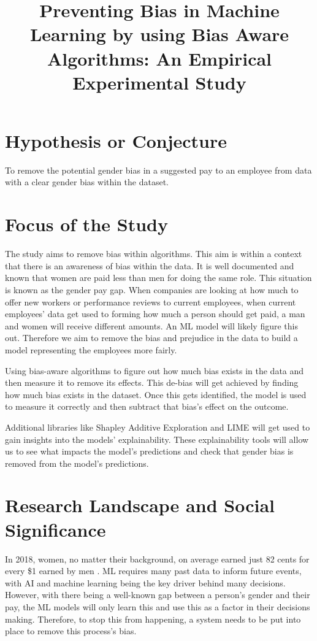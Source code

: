 \documentclass{sigchi}
\def\plaintitle{Preventing Bias in Machine Learning by using Bias Aware Algorithms: An Empirical Experimental Study}
\begin{document}
\title{\plaintitle}

\author{%
}

\maketitle

\section{Hypothesis or Conjecture}
To remove the potential gender bias in a suggested pay to an employee from data with a clear gender bias within the dataset.

\section{Focus of the Study}
The study aims to remove bias within algorithms. This aim is within a context that there is an awareness of bias within the data. It is well documented and known that women are paid less than men for doing the same role. This situation is known as the gender pay gap. When companies are looking at how much to offer new workers or performance reviews to current employees, when current employees' data get used to forming how much a person should get paid, a man and women will receive different amounts. An ML model will likely figure this out. Therefore we aim to remove the bias and prejudice in the data to build a model representing the employees more fairly.

Using bias-aware algorithms to figure out how much bias exists in the data and then measure it to remove its effects. This de-bias will get achieved by finding how much bias exists in the dataset. Once this gets identified, the model is used to measure it correctly and then subtract that bias's effect on the outcome.

Additional libraries like Shapley Additive Exploration and LIME will get used to gain insights into the models' explainability. These explainability tools will allow us to see what impacts the model's predictions and check that gender bias is removed from the model's predictions. 


\section{Research Landscape and Social Significance}
In 2018, women, no matter their background, on average earned just 82 cents for every \$1 earned by men \cite{paygapfacts}. ML requires many past data to inform future events, with AI and machine learning being the key driver behind many decisions. However, with there being a well-known gap between a person's gender and their pay, the ML models will only learn this and use this as a factor in their decisions making. Therefore, to stop this from happening, a system needs to be put into place to remove this process's bias. 
\end{document}
